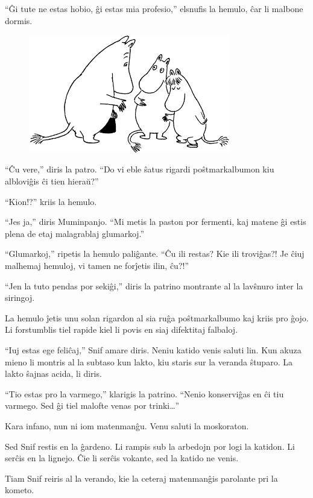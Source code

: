 ``Ĝi tute ne estas hobio, ĝi estas mia profesio,'' elsnufis la hemulo, ĉar li malbone dormis.

\begin{figure}[htbp]
\centering
\includegraphics[width=250pt,height=146pt]{9-2.png}
\caption{}
\label{9-2}
\end{figure}

``Ĉu vere,'' diris la patro. ``Do vi eble ŝatus rigardi poŝtmarkalbumon kiu albloviĝis ĉi tien hieraŭ?''

``Kion!?'' kriis la hemulo.

``Jes ja,'' diris Muminpanjo. ``Mi metis la paston por fermenti, kaj matene ĝi estis plena de etaj malagrablaj glumarkoj.''

``Glumarkoj,'' ripetis la hemulo paliĝante. ``Ĉu ili restas? Kie ili troviĝas?! Je ĉiuj malhemaj hemuloj, vi tamen ne forĵetis ilin, ĉu?!''

``Jen la tuto pendas por sekiĝi,'' diris la patrino montrante al la lavŝnuro inter la siringoj.

La hemulo ĵetis unu solan rigardon al sia ruĝa poŝtmarkalbumo kaj kriis pro ĝojo. Li forstumblis tiel rapide kiel li povis en siaj difektitaj falbaloj.

``Iuj estas ege feliĉaj,'' Snif amare diris. Neniu katido venis saluti lin. Kun akuza mieno li montris al la subtaso kun lakto, kiu staris sur la veranda ŝtuparo. La lakto ŝajnas acida, li diris.

``Tio estas pro la varmego,'' klarigis la patrino. ``Nenio konserviĝas en ĉi tiu varmego. Sed ĝi tiel malofte venas por trinki{\ldots}''

Kara infano, nun ni iom matenmanĝu. Venu saluti la moskoraton.

Sed Snif restis en la ĝardeno. Li rampis sub la arbedojn por logi la katidon. Li serĉis en la lignejo. Ĉie li serĉis vokante, sed la katido ne venis.

Tiam Snif reiris al la verando, kie la ceteraj matenmanĝis parolante pri la kometo.


